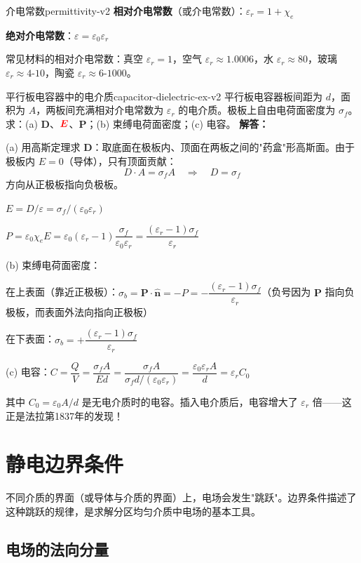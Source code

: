 \documentclass[11pt,a4paper,openany,oneside]{book}
\newcommand{\vecE}{\textcolor{red}{\vect{E}}}
\newcommand{\eps}{\varepsilon}
\newcommand{\vect}[1]{\bm{#1}}
\newcommand{\unitvec}[1]{\hat{\vect{#1}}}
\newcommand{\difficulty}[1]{\marginnote{\textcolor{red}{\textbf{[#1]}}}}
\begin{document}
\begin{definition}{介电常数}{permittivity-v2}
\textbf{相对介电常数}（或介电常数）：$\eps_r = 1 + \chi_e$

\textbf{绝对介电常数}：$\eps = \eps_0\eps_r$

常见材料的相对介电常数：真空 $\eps_r = 1$，空气 $\eps_r \approx 1.0006$，水 $\eps_r \approx 80$，玻璃 $\eps_r \approx 4$-$10$，陶瓷 $\eps_r \approx 6$-$1000$。
\end{definition}

\begin{example}{平行板电容器中的电介质}{capacitor-dielectric-ex-v2}
\difficulty{基础}
平行板电容器板间距为 $d$，面积为 $A$，两板间充满相对介电常数为 $\eps_r$ 的电介质。极板上自由电荷面密度为 $\sigma_f$。求：(a) $\vect{D}$、$\vecE$、$\vect{P}$；(b) 束缚电荷面密度；(c) 电容。
\tcblower
\textbf{解答：}

(a) 用高斯定理求 $\vect{D}$：取底面在极板内、顶面在两板之间的"药盒"形高斯面。由于极板内 $E=0$（导体），只有顶面贡献：
\[
D \cdot A = \sigma_f A \quad\Rightarrow\quad D = \sigma_f
\]
方向从正极板指向负极板。

$E = D/\eps = \sigma_f/(\eps_0\eps_r)$

$P = \eps_0\chi_e E = \eps_0(\eps_r - 1)\dfrac{\sigma_f}{\eps_0\eps_r} = \dfrac{(\eps_r - 1)\sigma_f}{\eps_r}$

(b) 束缚电荷面密度：

在上表面（靠近正极板）：$\sigma_b = \vect{P}\cdot\unitvec{n} = -P = -\dfrac{(\eps_r-1)\sigma_f}{\eps_r}$（负号因为 $\vect{P}$ 指向负极板，而表面外法向指向正极板）

在下表面：$\sigma_b = +\dfrac{(\eps_r-1)\sigma_f}{\eps_r}$

(c) 电容：$C = \dfrac{Q}{V} = \dfrac{\sigma_f A}{E d} = \dfrac{\sigma_f A}{\sigma_f d/(\eps_0\eps_r)} = \dfrac{\eps_0\eps_r A}{d} = \eps_r C_0$

其中 $C_0 = \eps_0 A/d$ 是无电介质时的电容。插入电介质后，电容增大了 $\eps_r$ 倍——这正是法拉第1837年的发现！
\end{example}

\section{静电边界条件}

不同介质的界面（或导体与介质的界面）上，电场会发生"跳跃"。边界条件描述了这种跳跃的规律，是求解分区均匀介质中电场的基本工具。

\subsection{电场的法向分量}
\end{document}
